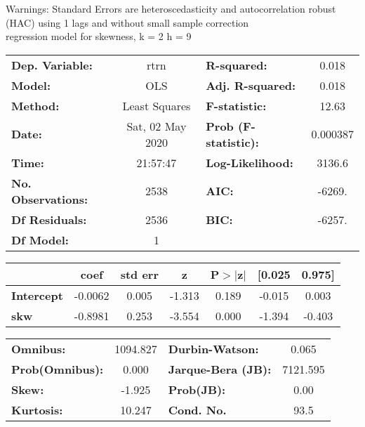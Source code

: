 Warnings: \newline
 [1] Standard Errors are heteroscedasticity and autocorrelation robust (HAC) using 1 lags and without small sample correction\\ 

regression model for skewness, k = 2 h = 9\begin{center}
\begin{tabular}{lclc}
\toprule
\textbf{Dep. Variable:}    &       rtrn       & \textbf{  R-squared:         } &     0.018   \\
\textbf{Model:}            &       OLS        & \textbf{  Adj. R-squared:    } &     0.018   \\
\textbf{Method:}           &  Least Squares   & \textbf{  F-statistic:       } &     12.63   \\
\textbf{Date:}             & Sat, 02 May 2020 & \textbf{  Prob (F-statistic):} &  0.000387   \\
\textbf{Time:}             &     21:57:47     & \textbf{  Log-Likelihood:    } &    3136.6   \\
\textbf{No. Observations:} &        2538      & \textbf{  AIC:               } &    -6269.   \\
\textbf{Df Residuals:}     &        2536      & \textbf{  BIC:               } &    -6257.   \\
\textbf{Df Model:}         &           1      & \textbf{                     } &             \\
\bottomrule
\end{tabular}
\begin{tabular}{lcccccc}
                   & \textbf{coef} & \textbf{std err} & \textbf{z} & \textbf{P$> |$z$|$} & \textbf{[0.025} & \textbf{0.975]}  \\
\midrule
\textbf{Intercept} &      -0.0062  &        0.005     &    -1.313  &         0.189        &       -0.015    &        0.003     \\
\textbf{skw}       &      -0.8981  &        0.253     &    -3.554  &         0.000        &       -1.394    &       -0.403     \\
\bottomrule
\end{tabular}
\begin{tabular}{lclc}
\textbf{Omnibus:}       & 1094.827 & \textbf{  Durbin-Watson:     } &    0.065  \\
\textbf{Prob(Omnibus):} &   0.000  & \textbf{  Jarque-Bera (JB):  } & 7121.595  \\
\textbf{Skew:}          &  -1.925  & \textbf{  Prob(JB):          } &     0.00  \\
\textbf{Kurtosis:}      &  10.247  & \textbf{  Cond. No.          } &     93.5  \\
\bottomrule
\end{tabular}
\end{center}

